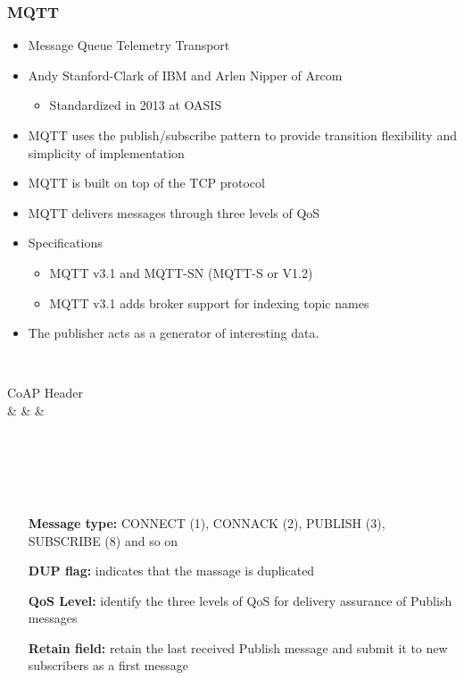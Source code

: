 \subsubsection{MQTT}
\begin{itemize}
	\item Message Queue Telemetry Transport
	\item Andy Stanford-Clark of IBM and Arlen Nipper of Arcom
		\begin{itemize}
			\item Standardized in 2013 at OASIS
		\end{itemize}
	\item MQTT uses the publish/subscribe pattern to provide transition flexibility and simplicity of implementation
	\item MQTT is built on top of the TCP protocol
	\item MQTT delivers messages through three levels of QoS
	\item Specifications
		\begin{itemize}
			\item MQTT v3.1 and MQTT-SN (MQTT-S or V1.2)
			\item MQTT v3.1 adds broker support for indexing topic names
		\end{itemize}
	\item The publisher acts as a generator of interesting data.
\end{itemize}

\begin{bytefield}[bitwidth=4em]{8}
	                                                     \\
	\begin{rightwordgroup}{CoAP Header}                                  \\
	 &  &  &   \\
	                                                        \\
	                                                      \\
	                                     \\
	\end{rightwordgroup}                                                 \\
\end{bytefield}
\begin{itemize}
\item[\textbf{Message type:}] CONNECT (1), CONNACK (2), PUBLISH (3), SUBSCRIBE (8) and so on
\item[\textbf{DUP flag:}] indicates that the massage is duplicated
\item[\textbf{QoS Level:}] identify the three levels of QoS for delivery assurance of Publish messages
\item[\textbf{Retain field:}] retain the last received Publish message and submit it to new subscribers as a first message
\end{itemize}

